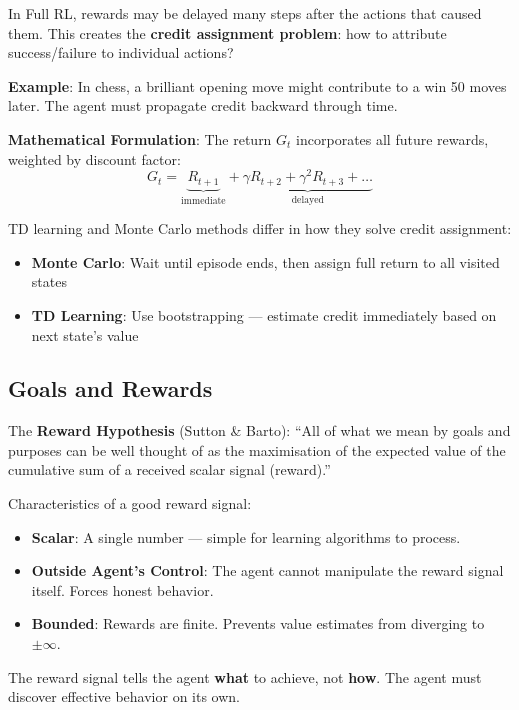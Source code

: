 \documentclass[11pt,a4paper]{article}
\begin{document}
\begin{tcolorbox}[colback=yellow!5!white,colframe=yellow!75!black,title=\textbf{The Credit Assignment Problem}]
In Full RL, rewards may be delayed many steps after the actions that caused them. This creates the \textbf{credit assignment problem}: how to attribute success/failure to individual actions?

\textbf{Example}: In chess, a brilliant opening move might contribute to a win 50 moves later. The agent must propagate credit backward through time.

\textbf{Mathematical Formulation}: The return $G_t$ incorporates all future rewards, weighted by discount factor:
\[
G_t = \underbrace{R_{t+1}}_{\text{immediate}} + \underbrace{\gamma R_{t+2} + \gamma^2 R_{t+3} + \ldots}_{\text{delayed}}
\]

TD learning and Monte Carlo methods differ in how they solve credit assignment:
\begin{itemize}
    \item \textbf{Monte Carlo}: Wait until episode ends, then assign full return to all visited states
    \item \textbf{TD Learning}: Use bootstrapping --- estimate credit immediately based on next state's value
\end{itemize}
\end{tcolorbox}

\subsection{Goals and Rewards}

The \textbf{Reward Hypothesis} (Sutton \& Barto): ``All of what we mean by goals and purposes can be well thought of as the maximisation of the expected value of the cumulative sum of a received scalar signal (reward).''

Characteristics of a good reward signal:
\begin{itemize}
    \item \textbf{Scalar}: A single number --- simple for learning algorithms to process.
    \item \textbf{Outside Agent's Control}: The agent cannot manipulate the reward signal itself. Forces honest behavior.
    \item \textbf{Bounded}: Rewards are finite. Prevents value estimates from diverging to $\pm\infty$.
\end{itemize}

The reward signal tells the agent \textbf{what} to achieve, not \textbf{how}. The agent must discover effective behavior on its own.
\end{document}
